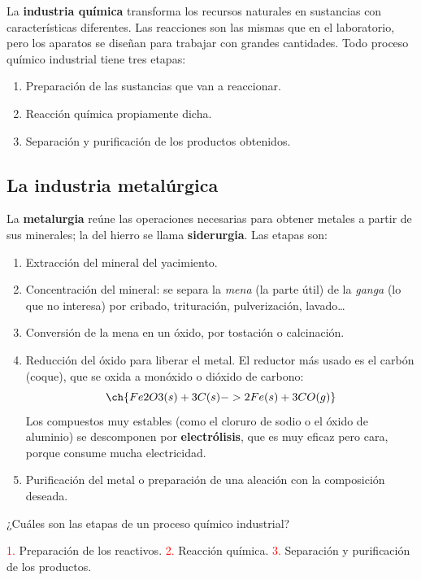 La \textbf{industria química} transforma los recursos naturales en sustancias con características diferentes. Las reacciones son las mismas que en el laboratorio, pero los aparatos se diseñan para trabajar con grandes cantidades. Todo proceso químico industrial tiene tres etapas:
\begin{enumerate}[label=\numberballblue]
    \item Preparación de las sustancias que van a reaccionar.
    \item Reacción química propiamente dicha.
    \item Separación y purificación de los productos obtenidos.
\end{enumerate}

\subsection{La industria metalúrgica}

La \textbf{metalurgia} reúne las operaciones necesarias para obtener metales a partir de sus minerales; la del hierro se llama \textbf{siderurgia}. Las etapas son:
\begin{enumerate}[label=\arabic*.]
    \item Extracción del mineral del yacimiento.
    \item Concentración del mineral: se separa la \emph{mena} (la parte útil) de la \emph{ganga} (lo que no interesa) por cribado, trituración, pulverización, lavado\ldots
    \item Conversión de la mena en un óxido, por tostación o calcinación.
    \item Reducción del óxido para liberar el metal. El reductor más usado es el carbón (coque), que se oxida a monóxido o dióxido de carbono:
    \[ \ch{Fe2O3 (s) + 3 C (s) -> 2 Fe (s) + 3 CO (g)} \]
    Los compuestos muy estables (como el cloruro de sodio o el óxido de aluminio) se descomponen por \textbf{electrólisis}, que es muy eficaz pero cara, porque consume mucha electricidad.
    \item Purificación del metal o preparación de una aleación con la composición deseada.
\end{enumerate}

\begin{exercise}
    ¿Cuáles son las etapas de un proceso químico industrial?
    \begin{solu}
        \textcolor{red}{1.} Preparación de los reactivos. \textcolor{red}{2.} Reacción química. \textcolor{red}{3.} Separación y purificación de los productos.
    \end{solu}
\end{exercise}

